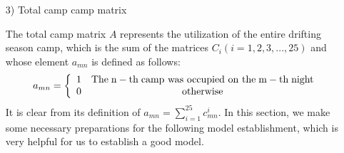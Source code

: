\begin{enumerate}
	\item[3)]Total camp camp matrix
	\par The total camp matrix $A$ represents the utilization of the entire drifting season camp, which is the sum of the matrices ${C_i}(i = 1,2,3,...,25)$ and whose element ${a_{mn}}$ is defined as follows:
	\begin{equation}
		{a_{mn}} = \left\{ {\begin{array}{*{20}{c}}
			{\rm{1}}&{{\rm{The\; n-th\; camp\ was\ occupied\ on\ the\; m-th\; night}}}\\
			{\rm{0}}&{{\rm{otherwise}}}
			\end{array}} \right.\label{aa1}
	\end{equation}
	It is clear from its definition of ${a_{mn}} = \sum\limits_{i = 1}^{25} {c_{mn}^i} $.
	In this section, we make some necessary preparations for the following model establishment, which is very helpful for us to establish a good model.
\end{enumerate}

